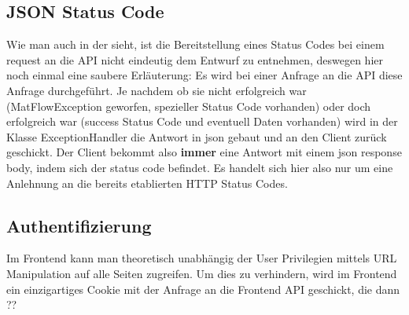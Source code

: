 \subsection{JSON Status Code}
Wie man auch in der  sieht, ist die Bereitstellung eines Status Codes bei einem request an die API nicht eindeutig
dem Entwurf zu entnehmen, deswegen hier noch einmal eine saubere Erläuterung:
Es wird bei einer Anfrage an die API diese Anfrage durchgeführt. Je nachdem ob sie nicht erfolgreich war (MatFlowException 
geworfen, spezieller Status Code vorhanden) oder doch erfolgreich war (success Status Code und eventuell Daten vorhanden) 
wird in der Klasse ExceptionHandler die Antwort in json gebaut und an den Client zurück geschickt. 
Der Client bekommt also \textbf{immer} eine Antwort mit einem json response body, indem sich der status code befindet. 
Es handelt sich hier also nur um eine Anlehnung an die bereits etablierten HTTP Status Codes.

\subsection{Authentifizierung} \label{Cookie}
Im Frontend kann man theoretisch unabhängig der User Privilegien mittels URL Manipulation auf alle 
Seiten zugreifen. Um dies zu verhindern, wird im Frontend ein einzigartiges Cookie mit der Anfrage an die Frontend
API geschickt, die dann ??





